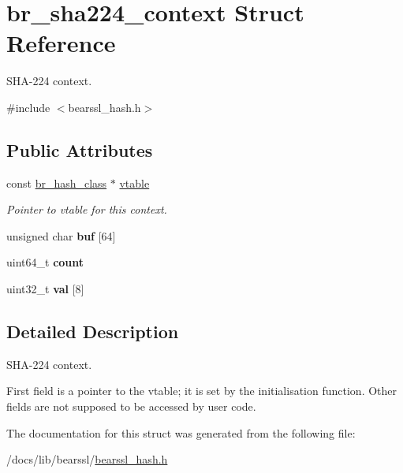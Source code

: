 \hypertarget{structbr__sha224__context}{}\section{br\+\_\+sha224\+\_\+context Struct Reference}
\label{structbr__sha224__context}


S\+H\+A-\/224 context.  




{\ttfamily \#include $<$bearssl\+\_\+hash.\+h$>$}

\subsection*{Public Attributes}
\begin{DoxyCompactItemize}
\item 
\mbox{\label{structbr__sha224__context_a6228bdda4ace7bb68e4ddfda50e5a7d1}} 
const \hyperlink{bearssl__hash_8h_ae38c1b9d539537cc16fc84388b922d86}{br\+\_\+hash\+\_\+class} $\ast$ \hyperlink{structbr__sha224__context_a6228bdda4ace7bb68e4ddfda50e5a7d1}{vtable}
\begin{DoxyCompactList}\small\item\em Pointer to vtable for this context. \end{DoxyCompactList}\item 
\mbox{\label{structbr__sha224__context_a12c49d350850c448dd49b189edfe0e4d}} 
unsigned char {\bfseries buf} \mbox{[}64\mbox{]}
\item 
\mbox{\label{structbr__sha224__context_ae8095a809c0698c17dbfadb093585b4c}} 
uint64\+\_\+t {\bfseries count}
\item 
\mbox{\label{structbr__sha224__context_ac1fbeb3887e41820e0261659a6158a6c}} 
uint32\+\_\+t {\bfseries val} \mbox{[}8\mbox{]}
\end{DoxyCompactItemize}


\subsection{Detailed Description}
S\+H\+A-\/224 context. 

First field is a pointer to the vtable; it is set by the initialisation function. Other fields are not supposed to be accessed by user code. 

The documentation for this struct was generated from the following file\+:\begin{DoxyCompactItemize}
\item 
/docs/lib/bearssl/\hyperlink{bearssl__hash_8h}{bearssl\+\_\+hash.\+h}\end{DoxyCompactItemize}
